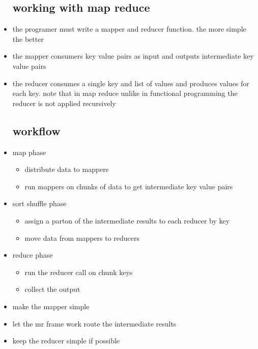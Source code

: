 \documentclass{article}
\begin{document}
\begin{itemize}
\subsection*{working with map reduce}
\item the programer must write a mapper and reducer function. the more simple the better 
\item the mapper consumers key value pairs as input and outputs intermediate key value pairs
\item the reducer consumes a single key and list of values and produces values for each key. note that in map reduce unlike in functional programming the reducer is not applied recursively
\subsection*{workflow}
\item map phase
\begin{itemize}
    \item distribute data to mappers 
    \item run mappers on chunks of data to get intermediate key value pairs 
\end{itemize}
\item sort shuffle phase
\begin{itemize}
    \item assign a parton of the  intermediate results to each reducer by key
    \item move data from mappers to reducers
\end{itemize}
\item reduce phase
\begin{itemize}
    \item run the reducer call on chunk keys
    \item collect the output 
\end{itemize}
\item make the mapper simple 
\item let the mr frame work route the intermediate results
\item keep the reducer simple if possible 

\end{itemize}
\end{document}
